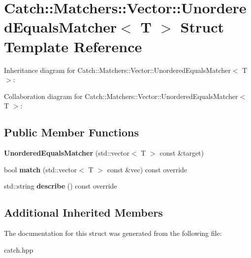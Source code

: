 \hypertarget{structCatch_1_1Matchers_1_1Vector_1_1UnorderedEqualsMatcher}{}\section{Catch\+:\+:Matchers\+:\+:Vector\+:\+:Unordered\+Equals\+Matcher$<$ T $>$ Struct Template Reference}
\label{structCatch_1_1Matchers_1_1Vector_1_1UnorderedEqualsMatcher}


Inheritance diagram for Catch\+:\+:Matchers\+:\+:Vector\+:\+:Unordered\+Equals\+Matcher$<$ T $>$\+:


Collaboration diagram for Catch\+:\+:Matchers\+:\+:Vector\+:\+:Unordered\+Equals\+Matcher$<$ T $>$\+:
\subsection*{Public Member Functions}
\begin{DoxyCompactItemize}
\item 
\mbox{\label{structCatch_1_1Matchers_1_1Vector_1_1UnorderedEqualsMatcher_a525905639b2b15b52ddb0bf14bfa19da}} 
{\bfseries Unordered\+Equals\+Matcher} (std\+::vector$<$ T $>$ const \&target)
\item 
\mbox{\label{structCatch_1_1Matchers_1_1Vector_1_1UnorderedEqualsMatcher_a3ccdd9dd2cd8bdbb8bb121acbb9cb358}} 
bool {\bfseries match} (std\+::vector$<$ T $>$ const \&vec) const override
\item 
\mbox{\label{structCatch_1_1Matchers_1_1Vector_1_1UnorderedEqualsMatcher_a7202d811200317abc58c844f663823df}} 
std\+::string {\bfseries describe} () const override
\end{DoxyCompactItemize}
\subsection*{Additional Inherited Members}


The documentation for this struct was generated from the following file\+:\begin{DoxyCompactItemize}
\item 
catch.\+hpp\end{DoxyCompactItemize}
